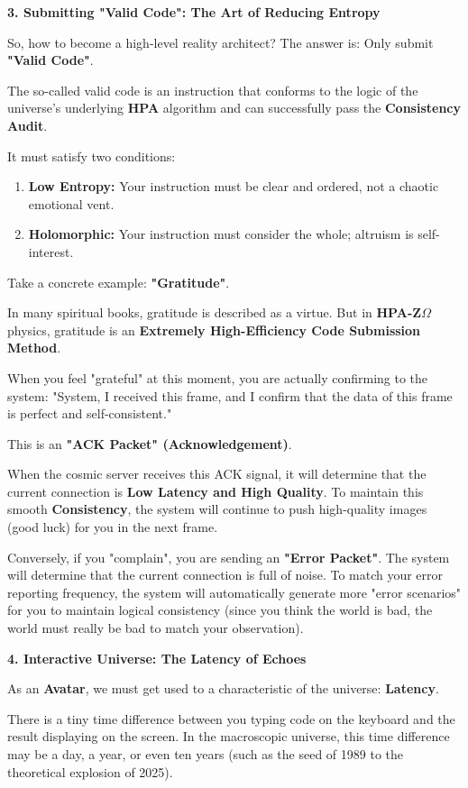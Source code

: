 \textbf{3. Submitting "Valid Code": The Art of Reducing Entropy}

So, how to become a high-level reality architect? The answer is: Only submit \textbf{"Valid Code"}.

The so-called valid code is an instruction that conforms to the logic of the universe's underlying \textbf{HPA} algorithm and can successfully pass the \textbf{Consistency Audit}.

It must satisfy two conditions:

\begin{enumerate}
\item \textbf{Low Entropy:} Your instruction must be clear and ordered, not a chaotic emotional vent.
\item \textbf{Holomorphic:} Your instruction must consider the whole; altruism is self-interest.
\end{enumerate}

Take a concrete example: \textbf{"Gratitude"}.

In many spiritual books, gratitude is described as a virtue. But in \textbf{HPA-Z$\Omega$} physics, gratitude is an \textbf{Extremely High-Efficiency Code Submission Method}.

When you feel "grateful" at this moment, you are actually confirming to the system:
"System, I received this frame, and I confirm that the data of this frame is perfect and self-consistent."

This is an \textbf{"ACK Packet" (Acknowledgement)}.

When the cosmic server receives this ACK signal, it will determine that the current connection is \textbf{Low Latency and High Quality}. To maintain this smooth \textbf{Consistency}, the system will continue to push high-quality images (good luck) for you in the next frame.

Conversely, if you "complain", you are sending an \textbf{"Error Packet"}. The system will determine that the current connection is full of noise. To match your error reporting frequency, the system will automatically generate more "error scenarios" for you to maintain logical consistency (since you think the world is bad, the world must really be bad to match your observation).

\textbf{4. Interactive Universe: The Latency of Echoes}

As an \textbf{Avatar}, we must get used to a characteristic of the universe: \textbf{Latency}.

There is a tiny time difference between you typing code on the keyboard and the result displaying on the screen. In the macroscopic universe, this time difference may be a day, a year, or even ten years (such as the seed of 1989 to the theoretical explosion of 2025).

